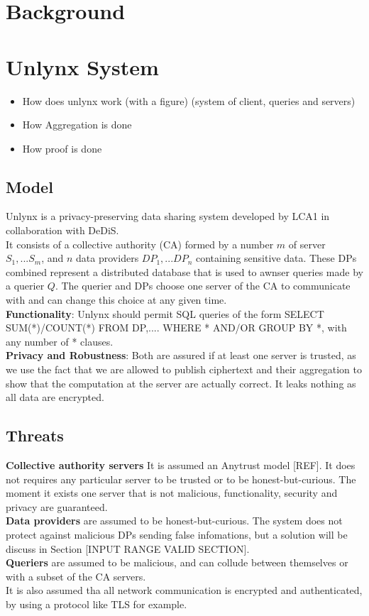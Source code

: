 \documentclass{article}
\begin{document}
\section*{Background}

\section{Unlynx System}
\begin{itemize}
\item How does unlynx work (with a figure) (system of client, queries and servers)
\item How Aggregation is done
\item How proof is done
\end{itemize}
\subsection{Model}
Unlynx is a privacy-preserving data sharing system developed by LCA1 in collaboration with DeDiS.\\
It consists of a collective authority (CA) formed by a number $m$ of server $S_1,...S_m$, and $n$ data providers $DP_1,...DP_n$ containing sensitive data. These DPs combined represent a distributed database that is used to awnser queries made by a querier $Q$. The querier and DPs choose one server of the CA to communicate with and can change this choice at any given time.\\
\textbf{Functionality}: Unlynx should permit SQL queries of the form SELECT SUM(*)/COUNT(*) FROM DP,.... WHERE * AND/OR GROUP BY *, with any number of * clauses.\\
\textbf{Privacy and Robustness}: Both are assured if at least one server is trusted, as we use the fact that we are allowed to publish ciphertext and their aggregation to show that the computation at the server are actually correct. It leaks nothing as all data are encrypted.

\subsection{Threats}
\textbf{Collective authority servers} It is assumed an Anytrust model [REF]. It does not requires any particular server to be trusted or to be honest-but-curious. The moment it exists one server that is not malicious, functionality, security and privacy are guaranteed.\\
\textbf{Data providers} are assumed to be honest-but-curious. The system does not protect against malicious DPs sending false infomations, but a solution will be discuss  in Section [INPUT RANGE VALID SECTION].\\
\textbf{Queriers} are assumed to be malicious, and can collude between themselves or with a subset of the CA servers.\\
It is also assumed tha all network communication is encrypted and authenticated, by using a protocol like TLS for example.
\end{document}
